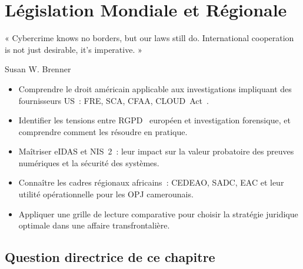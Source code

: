 
\chapter{Législation Mondiale et Régionale}
\label{chap:leg-mond}

\epigraph{%
    « Cybercrime knows no borders, but our laws still do.
    International cooperation is not just desirable, it's imperative. »%
}{Susan W. Brenner}


\begin{boxobjectifs}
\begin{itemize}
    \item Comprendre le droit américain applicable aux investigations
          impliquant des fournisseurs US~: FRE, SCA, CFAA, CLOUD~Act~\cite{cloudact2018}.
    \item Identifier les tensions entre RGPD~\cite{rgpd2016} européen et investigation
          forensique, et comprendre comment les résoudre en pratique.
    \item Maîtriser eIDAS et NIS~2~: leur impact sur la valeur probatoire
          des preuves numériques et la sécurité des systèmes.
    \item Connaître les cadres régionaux africains~: CEDEAO, SADC, EAC
          et leur utilité opérationnelle pour les OPJ camerounais.
    \item Appliquer une grille de lecture comparative pour choisir
          la stratégie juridique optimale dans une affaire transfrontalière.
\end{itemize}
\end{boxobjectifs}

\bigskip

\section*{Question directrice de ce chapitre}


